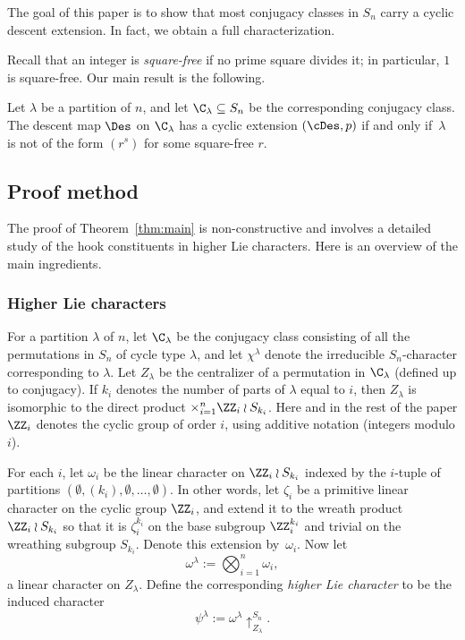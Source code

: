 The goal of this paper is to show that most conjugacy classes in $S_n$ carry a cyclic descent extension.
In fact, we obtain a full characterization.

Recall that an integer is \emph{square-free} if no prime square divides it; in particular, $1$ is square-free. Our main result is the following. 
	
\begin{theorem}\label{thm:main}
    Let $\lambda$ be a partition of $n$, and let
    $\C_\lambda \subseteq S_n$ be the corresponding conjugacy class. 
    The descent map $\Des$ on $\C_\lambda$ has a cyclic extension $(\cDes,p)$ if and only if~$\lambda$ is not of the form $(r^s)$ for some square-free $r$.
\end{theorem}
	

\subsection{Proof method} 
	
The proof of Theorem~\ref{thm:main} is non-constructive and   
involves a detailed study of the hook constituents in higher Lie characters.
Here is an overview of the main ingredients.


\subsubsection{Higher Lie characters}

\begin{definition}\label{def:higher}
For a partition $\lambda$ of $n$, let $\C_\lambda$ be the conjugacy class consisting of all the permutations in $S_n$ of cycle type $\lambda$,
and let $\chi^\lambda$ denote the irreducible $S_n$-character corresponding to $\lambda$.
Let $Z_\lambda$ be the centralizer of a permutation in $\C_\lambda$ (defined up to conjugacy). 
If $k_i$ denotes the number of parts of $\lambda$ equal to $i$, then $Z_\lambda$ is isomorphic to the direct	product $\times_{i=1}^n \ZZ_i\wr S_{k_i}$.
Here and in the rest of the paper $\ZZ_i$ denotes the cyclic group of order $i$, using additive notation (integers modulo $i$).
	
For each $i$, let $\omega_i$ be the linear character on $\ZZ_i\wr S_{k_i}$ indexed by the
$i$-tuple of partitions $(\emptyset, (k_i), \emptyset,
\dots,\emptyset)$. 
In other words, let $\zeta_i$ be a primitive linear character on the cyclic group $\ZZ_i$, and extend it to the wreath product $\ZZ_i\wr S_{k_i}$ so that it is $\zeta_i^{k_i}$
on the base subgroup $\ZZ_i^{k_i}$ and trivial on the wreathing subgroup $S_{k_i}$. Denote this extension by~$\omega_i$.
Now let
\[
\omega^\lambda := \bigotimes_{i=1}^n \omega_i,
\]
a linear character on $Z_\lambda$. 
Define the corresponding {\em higher Lie character} to be the induced character
\[
\psi^\lambda := \omega^\lambda\uparrow_{Z_\lambda}^{S_n}.
\]
\end{definition}

